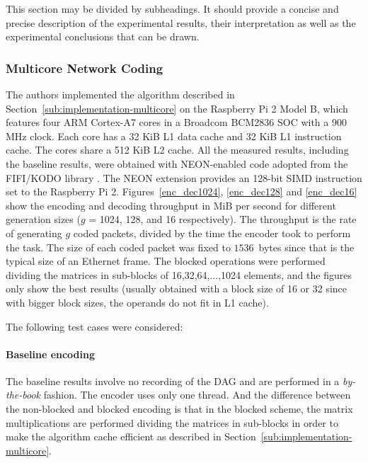 \label{sec:measurements}

This section may be divided by subheadings. It should provide a concise and
precise description of the experimental results, their interpretation as well as
the experimental conclusions that can be drawn.

\subsubsection{Multicore Network Coding}
\label{subs:multicore-network-coding}

The authors implemented the algorithm described in
Section~\ref{sub:implementation-multicore} on the Raspberry Pi 2 Model B, which
features four ARM Cortex-A7 cores in a Broadcom BCM2836 \ac{SOC} with a 900 MHz
clock. Each core has a 32 KiB L1 data cache and 32 KiB L1 instruction cache. The
cores share a 512 KiB L2 cache. All the measured results, including the baseline
results, were obtained with NEON-enabled code adopted from the FIFI/KODO library
\cite{kodo2011pedersen}. The NEON extension provides an 128-bit \ac{SIMD}
instruction set to the Raspberry Pi 2. Figures~\ref{enc_dec1024},
\ref{enc_dec128} and \ref{enc_dec16} show the encoding and decoding throughput
in MiB per second for different generation sizes ($g$ = 1024, 128, and 16
respectively). The throughput is the rate of generating $g$ coded packets,
divided by the time the encoder took to perform the task. The size of each coded
packet was fixed to $1536$~bytes since that is the typical size of an Ethernet
frame. The blocked operations were performed dividing the matrices in sub-blocks
of 16,32,64,...,1024 elements, and the figures only show the best results (usually obtained with a block size of 16 or 32 since with bigger block sizes, the operands do not fit in L1 cache).

The following test cases were considered:

\paragraph{Baseline encoding} The baseline results involve no recording
of the \ac{DAG} and are performed in a \emph{by-the-book} fashion. The encoder
uses only one thread. And the difference between the non-blocked and blocked
encoding is that in the blocked scheme, the matrix multiplications are performed
dividing the matrices in sub-blocks in order to make the algorithm cache
efficient as described in Section~\ref{sub:implementation-multicore}.

